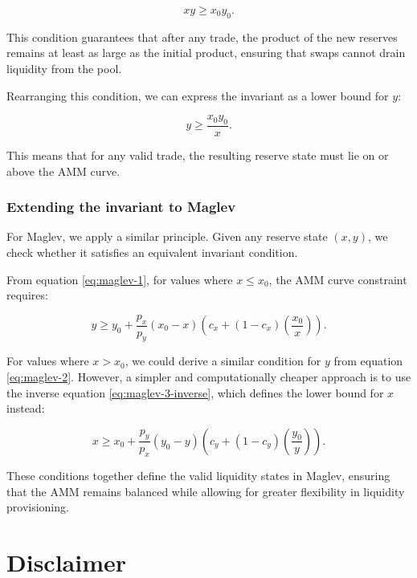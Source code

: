 \documentclass{article}
\begin{document}
\begin{equation}
    xy \geq x_0 y_0.
\end{equation}

This condition guarantees that after any trade, the product of the new reserves remains at least as large as the initial product, ensuring that swaps cannot drain liquidity from the pool.

Rearranging this condition, we can express the invariant as a lower bound for $y$:

\begin{equation}
    y \geq \frac{x_0 y_0}{x}.
\end{equation}

This means that for any valid trade, the resulting reserve state must lie on or above the AMM curve.  

\subsubsection{Extending the invariant to Maglev}

For Maglev, we apply a similar principle. Given any reserve state $(x, y)$, we check whether it satisfies an equivalent invariant condition.

From equation \eqref{eq:maglev-1}, for values where \( x \leq x_0 \), the AMM curve constraint requires:

\begin{equation}
    \label{eq:invariant-x1}
    y \geq y_{0}+\frac{p_{x}}{p_{y}}\left(x_{0}-x\right)\left(c_{x}+\left(1-c_{x}\right)\left(\frac{x_{0}}{x}\right)\right).
\end{equation}

For values where \( x > x_0 \), we could derive a similar condition for $y$ from equation \eqref{eq:maglev-2}. However, a simpler and computationally cheaper approach is to use the inverse equation \eqref{eq:maglev-3-inverse}, which defines the lower bound for $x$ instead:

\begin{equation}
    \label{eq:invariant-x2}
    x \geq x_{0}+\frac{p_{y}}{p_{x}}\left(y_{0}-y\right)\left(c_{y}+\left(1-c_{y}\right)\left(\frac{y_{0}}{y}\right)\right).
\end{equation}

These conditions together define the valid liquidity states in Maglev, ensuring that the AMM remains balanced while allowing for greater flexibility in liquidity provisioning.

\section{Disclaimer}
\end{document}
